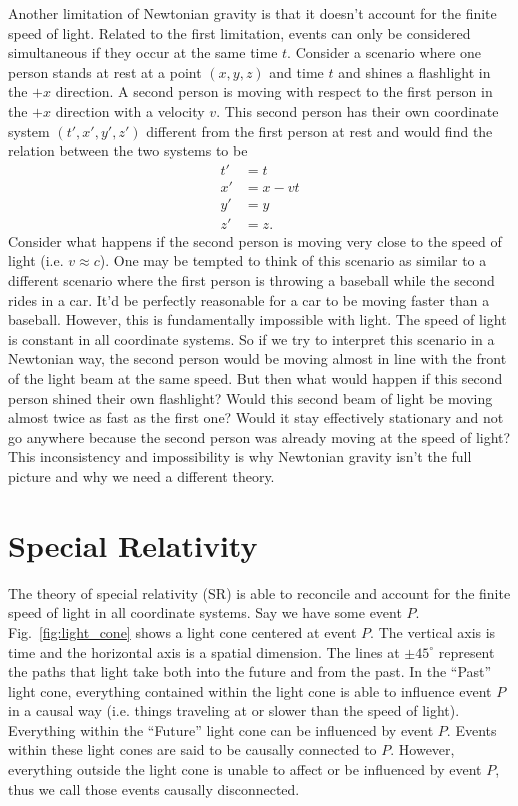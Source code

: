 \begin{bibunit}[unsrtnat]
Another limitation of Newtonian gravity is that it doesn't account for the
finite speed of light. Related to the first limitation, events can only be
considered simultaneous if they occur at the same time $t$. Consider a scenario
where one person stands at rest at a point $(x,y,z)$ and time $t$ and shines a
flashlight in the $+x$ direction. A second person is moving with respect to the
first person in the $+x$ direction with a velocity $v$. This second person has
their own coordinate system $(t',x',y',z')$ different from the first person at
rest and would find the relation between the two systems to be
\begin{align}
   t' &= t \\
   x' &= x - vt \\
   y' &= y \\
   z' &= z .
\end{align}
Consider what happens if the second person is moving very close to the speed of
light (i.e. $v \approx c$). One may be tempted to think of this scenario as
similar to a different scenario where the first person is throwing a baseball
while the second rides in a car. It'd be perfectly reasonable for a car to be
moving faster than a baseball. However, this is fundamentally impossible with
light. The speed of light is constant in all coordinate systems. So if we try to
interpret this scenario in a Newtonian way, the second person would be moving
almost in line with the front of the light beam at the same speed. But then what
would happen if this second person shined their own flashlight? Would this
second beam of light be moving almost twice as fast as the first one? Would it
stay effectively stationary and not go anywhere because the second person was
already moving at the speed of light? This inconsistency and impossibility is
why Newtonian gravity isn't the full picture and why we need a different theory.

\section{Special Relativity\label{sec:sr}}

The theory of special relativity (SR) is able to reconcile and account for the
finite speed of light in all coordinate systems. Say we have some event $P$.
Fig.~\ref{fig:light_cone} shows a light cone centered at event $P$. The vertical
axis is time and the horizontal axis is a spatial dimension. The lines at
$\pm45^{\circ}$ represent the paths that light take both into the future and
from the past. In the ``Past'' light cone, everything contained within the light
cone is able to influence event $P$ in a causal way (i.e. things traveling at or
slower than the speed of light). Everything within the ``Future'' light cone can
be influenced by event $P$. Events within these light cones are said to be
causally connected to $P$. However, everything outside the light cone is unable
to affect or be influenced by event $P$, thus we call those events causally
disconnected.


\end{bibunit}
